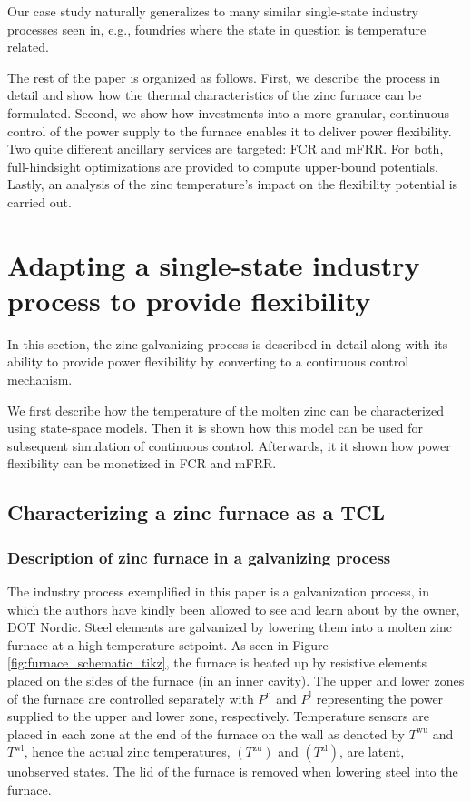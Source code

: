 \documentclass[sigconf]{acmart}
\begin{document}
Our case study naturally generalizes to many similar single-state industry processes seen in, e.g., foundries where the state in question is temperature related.


The rest of the paper is organized as follows. First, we describe the process in detail and show how the thermal characteristics of the zinc furnace can be formulated. Second, we show how investments into a more granular, continuous control of the power supply to the furnace enables it to deliver power flexibility. Two quite different ancillary services are targeted: FCR and mFRR. For both, full-hindsight optimizations are provided to compute upper-bound potentials. Lastly, an analysis of the zinc temperature's impact on the flexibility potential is carried out.


\section{Adapting a single-state industry process to provide flexibility}\label{sec:zinc_furnace_description}

In this section, the zinc galvanizing process is described in detail along with its ability to provide power flexibility by converting to a continuous control mechanism.

We first describe how the temperature of the molten zinc can be characterized using state-space models. Then it is shown how this model can be used for subsequent simulation of continuous control. Afterwards, it it shown how power flexibility can be monetized in FCR and mFRR.

\subsection{Characterizing a zinc furnace as a TCL}



\subsubsection{Description of zinc furnace in a galvanizing process}

The industry process exemplified in this paper is a galvanization process, in which the authors have kindly been allowed to see and learn about by the owner, DOT Nordic. Steel elements are galvanized by lowering them into a molten zinc furnace at a high temperature setpoint. As seen in Figure \ref{fig:furnace_schematic_tikz}, the furnace is heated up by resistive elements placed on the sides of the furnace (in an inner cavity). The upper and lower zones of the furnace are controlled separately with $P^{\text{u}}$ and $P^{\text{l}}$ representing the power supplied to the upper and lower zone, respectively. Temperature sensors are placed in each zone at the end of the furnace on the wall as denoted by $T^{\text{wu}}$ and $T^{\text{wl}}$, hence the actual zinc temperatures, $(T^{\text{zu}})$ and $(T^{\text{zl}})$, are latent, unobserved states. The lid of the furnace is removed when lowering steel into the furnace.
\end{document}
